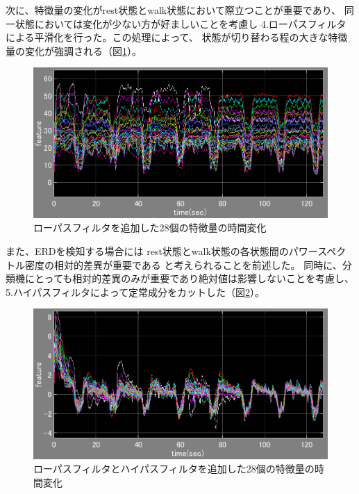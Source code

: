 次に、特徴量の変化がrest状態とwalk状態において際立つことが重要であり、
同一状態においては変化が少ない方が好ましいことを考慮し
4.ローパスフィルタによる平滑化を行った。この処理によって、
状態が切り替わる程の大きな特徴量の変化が強調される（図\ref{fig:lfilterERD}）。
\begin{figure}[p]
    \centering
    \includegraphics[width=13cm]{images/feature_sub1_l.png}
    \caption{ローパスフィルタを追加した28個の特徴量の時間変化}
    \label{fig:lfilterERD}
\end{figure}

また、ERDを検知する場合には
rest状態とwalk状態の各状態間のパワースペクトル密度の相対的差異が重要である
と考えられることを前述した。
同時に、分類機にとっても相対的差異のみが重要であり絶対値は影響しないことを考慮し、
5.ハイパスフィルタによって定常成分をカットした（図\ref{fig:filterERD}）。

\begin{figure}[p]
    \centering
    \includegraphics[width=13cm]{images/feature_sub1.png}
    \caption{ローパスフィルタとハイパスフィルタを追加した28個の特徴量の時間変化}
    \label{fig:filterERD}
\end{figure}